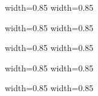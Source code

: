 \begin{frame}
      {width=0.85\textwidth} {}
      {width=0.85\textwidth} {}
\end{frame}
\begin{frame}
      {width=0.85\textwidth} {}
      {width=0.85\textwidth} {}
\end{frame}
\begin{frame}
      {width=0.85\textwidth} {}
      {width=0.85\textwidth} {}
\end{frame}
\begin{frame}
      {width=0.85\textwidth} {}
      {width=0.85\textwidth} {}
\end{frame}
\begin{frame}
      {width=0.85\textwidth} {}
      {width=0.85\textwidth} {}
\end{frame}

